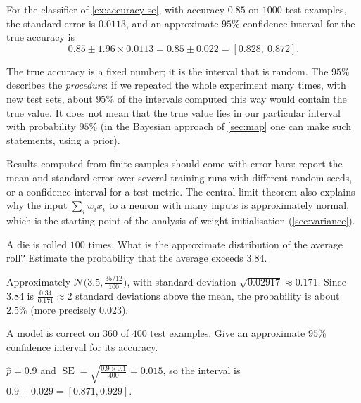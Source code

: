 \begin{example}\label{ex:accuracy-ci}
For the classifier of \cref{ex:accuracy-se}, with accuracy $0.85$ on $1000$ test
examples, the standard error is $0.0113$, and an approximate $95\%$ confidence
interval for the true accuracy is
\[
  0.85 \pm 1.96\times0.0113 = 0.85 \pm 0.022 = [0.828,\ 0.872].
\]
\end{example}

\begin{pitfall}
The true accuracy is a fixed number; it is the interval that is random. The
$95\%$ describes the \emph{procedure}: if we repeated the whole experiment many
times, with new test sets, about $95\%$ of the intervals computed this way would
contain the true value. It does not mean that the true value lies in our
particular interval with probability $95\%$ (in the Bayesian approach of
\cref{sec:map} one can make such statements, using a prior).
\end{pitfall}

\begin{mlnote}
Results computed from finite samples should come with error bars: report the
mean and standard error over several training runs with different random seeds,
or a confidence interval for a test metric. The central limit theorem also
explains why the input $\sum_iw_ix_i$ to a neuron with many inputs is
approximately normal, which is the starting point of the analysis of weight
initialisation (\cref{sec:variance}).
\end{mlnote}

\sectionexercises

\begin{exercise}
A die is rolled $100$ times. What is the approximate distribution of the average
roll? Estimate the probability that the average exceeds $3.84$.
\end{exercise}
\begin{solution}
Approximately $\mathcal{N}\bigl(3.5, \tfrac{35/12}{100}\bigr)$, with standard
deviation $\sqrt{0.02917} \approx 0.171$. Since $3.84$ is $\tfrac{0.34}{0.171}
\approx 2$ standard deviations above the mean, the probability is about
$2.5\%$ (more precisely $0.023$).
\end{solution}

\begin{exercise}
A model is correct on $360$ of $400$ test examples. Give an approximate $95\%$
confidence interval for its accuracy.
\end{exercise}
\begin{solution}
$\hat p = 0.9$ and $\operatorname{SE} = \sqrt{\tfrac{0.9\times0.1}{400}} = 0.015$, so
the interval is $0.9 \pm 0.029 = [0.871, 0.929]$.
\end{solution}

